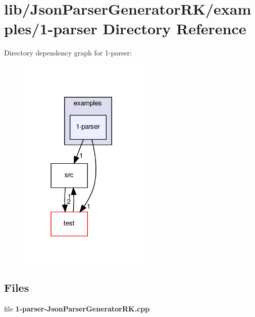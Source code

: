 \section{lib/\+Json\+Parser\+Generator\+R\+K/examples/1-\/parser Directory Reference}
\label{dir_6457620fc191843604daaf8be6cc4383}
Directory dependency graph for 1-\/parser\+:\nopagebreak
\begin{figure}[H]
\begin{center}
\leavevmode
\includegraphics[width=178pt]{dir_6457620fc191843604daaf8be6cc4383_dep}
\end{center}
\end{figure}
\subsection*{Files}
\begin{DoxyCompactItemize}
\item 
file \textbf{ 1-\/parser-\/\+Json\+Parser\+Generator\+R\+K.\+cpp}
\end{DoxyCompactItemize}
